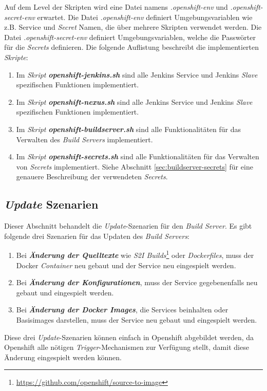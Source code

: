 Auf dem Level der Skripten wird eine Datei namens \emph{.openshift-env} und \emph{.openshift-secret-env} erwartet. Die Datei \emph{.openshift-env} definiert Umgebungsvariablen wie z.B. Service und \emph{Secret} Namen, die über mehrere Skripten verwendet werden. Die Datei \emph{.openshift-secret-env} definiert Umgebungsvariablen, welche die Passwörter für die \emph{Secrets} definieren. Die folgende Auflistung beschreibt die implementierten \emph{Skripte}:
\begin{enumerate}
	\item Im \emph{Skript} \textbf{\emph{openshift-jenkins.sh}} sind alle Jenkins Service und Jenkins \emph{Slave} spezifischen Funktionen implementiert.
	\item Im \emph{Skript} \textbf{\emph{openshift-nexus.sh}} sind alle Jenkins Service und Jenkins \emph{Slave} spezifischen Funktionen implementiert.
	\item Im \emph{Skript} \textbf{\emph{openshift-buildserver.sh}} sind alle Funktionalitäten für das Verwalten des \emph{Build Servers} implementiert.
	\item Im \emph{Skript} \textbf{\emph{openshift-secrets.sh}} sind alle Funktionalitäten für das Verwalten von \emph{Secrets} implementiert. Siehe Abschnitt \ref{sec:buildserver-secrets} für eine genauere Beschreibung der verwendeten \emph{Secrets}.
\end{enumerate}

\subsection{\emph{Update} Szenarien}
\label{sec:buildserver-updates}
Dieser Abschnitt behandelt die \emph{Update}-Szenarien für den \emph{Build Server}. Es gibt folgende drei Szenarien für das Updaten des \emph{Build Servers}:

\begin{enumerate}
	\item Bei \textbf{\emph{Änderung der Quelltexte}} wie \emph{S2I Builds}\footnote{\url{https://github.com/openshift/source-to-image}} oder \emph{Dockerfiles}, muss der Docker \emph{Container} neu gebaut und der Service neu eingespielt werden.
	\item Bei \textbf{\emph{Änderung der Konfigurationen}}, muss der Service gegebenenfalls neu gebaut und eingespielt werden.
	\item Bei \textbf{\emph{Änderung der Docker Images}}, die Services beinhalten oder Basisimages darstellen, muss der Service neu gebaut und eingespielt werden.
\end{enumerate}
Diese drei \emph{Update}-Szenarien können einfach in Openshift abgebildet werden, da Openshift alle nötigen \emph{Trigger}-Mechanismen zur Verfügung stellt, damit diese Änderung eingespielt werden können. 

